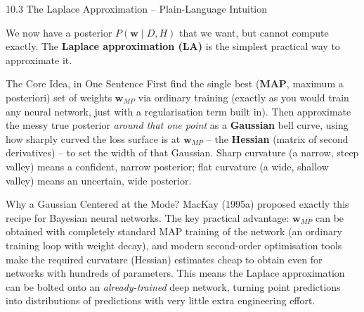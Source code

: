 \documentclass[aspectratio=169,10pt]{beamer}
\newcommand{\bw}{\mathbf{w}}
\begin{document}
\begin{frame}[allowframebreaks]{10.3 The Laplace Approximation -- Plain-Language Intuition}

We now have a posterior $P(\bw \mid D, H)$ that we want, but cannot compute
exactly. The \textbf{Laplace approximation (LA)} is the simplest practical
way to approximate it.

  \begin{alertblock}{The Core Idea, in One Sentence}
    First find the single best (\textbf{MAP}, maximum a posteriori) set of
    weights $\bw_{MP}$ via ordinary training (exactly as you would train any
    neural network, just with a regularisation term built in). Then
    approximate the messy true posterior \emph{around that one point} as a
    \textbf{Gaussian} bell curve, using how sharply curved the loss surface
    is at $\bw_{MP}$ -- the \textbf{Hessian} (matrix of second derivatives)
    -- to set the width of that Gaussian. Sharp curvature (a narrow, steep
    valley) means a confident, narrow posterior; flat curvature (a wide,
    shallow valley) means an uncertain, wide posterior.
  \end{alertblock}

  \begin{block}{Why a Gaussian Centered at the Mode?}
    MacKay (1995a) proposed exactly this recipe for Bayesian neural
    networks. The key practical advantage: $\bw_{MP}$ can be obtained with
    completely standard MAP training of the network (an ordinary training
    loop with weight decay), and modern second-order optimisation tools make
    the required curvature (Hessian) estimates cheap to obtain even for
    networks with hundreds of parameters. This means the Laplace
    approximation can be bolted onto an \emph{already-trained} deep network,
    turning point predictions into distributions of predictions with very
    little extra engineering effort.
  \end{block}

  \framebreak


\end{frame}
\end{document}
